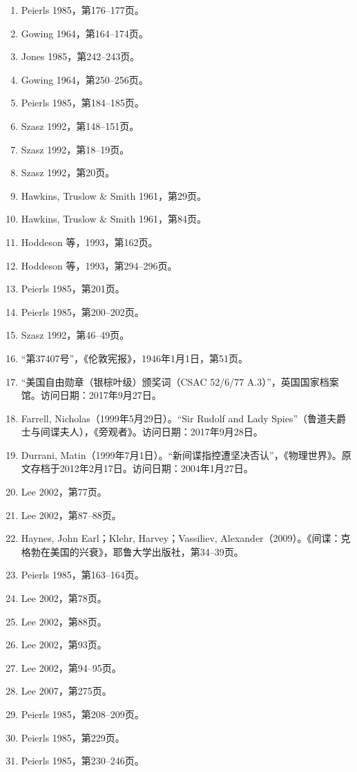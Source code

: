 \begin{enumerate}
\item Peierls 1985，第176–177页。
\item Gowing 1964，第164–174页。
\item Jones 1985，第242–243页。
\item Gowing 1964，第250–256页。
\item Peierls 1985，第184–185页。
\item Szasz 1992，第148–151页。
\item Szasz 1992，第18–19页。
\item Szasz 1992，第20页。
\item Hawkins, Truslow & Smith 1961，第29页。
\item Hawkins, Truslow & Smith 1961，第84页。
\item Hoddeson 等，1993，第162页。
\item Hoddeson 等，1993，第294–296页。
\item Peierls 1985，第201页。
\item Peierls 1985，第200–202页。
\item Szasz 1992，第46–49页。
\item “第37407号”，《伦敦宪报》，1946年1月1日，第51页。
\item “美国自由勋章（银棕叶级）颁奖词（CSAC 52/6/77 A.3）”，英国国家档案馆。访问日期：2017年9月27日。
\item Farrell, Nicholas（1999年5月29日）。“Sir Rudolf and Lady Spies”（鲁道夫爵士与间谍夫人），《旁观者》。访问日期：2017年9月28日。
\item Durrani, Matin（1999年7月1日）。“新间谍指控遭坚决否认”，《物理世界》。原文存档于2012年2月17日。访问日期：2004年1月27日。
\item Lee 2002，第77页。
\item Lee 2002，第87–88页。
\item Haynes, John Earl；Klehr, Harvey；Vassiliev, Alexander（2009）。《间谍：克格勃在美国的兴衰》，耶鲁大学出版社，第34–39页。
\item Peierls 1985，第163–164页。
\item Lee 2002，第78页。
\item Lee 2002，第88页。
\item Lee 2002，第93页。
\item Lee 2002，第94–95页。
\item Lee 2007，第275页。
\item Peierls 1985，第208–209页。
\item Peierls 1985，第229页。
\item Peierls 1985，第230–246页。

\end{enumerate}
